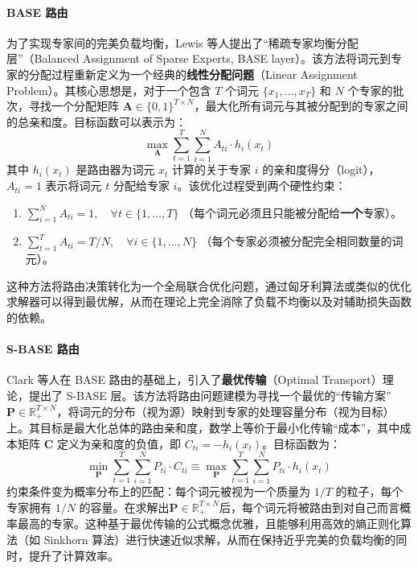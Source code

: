 \paragraph{BASE 路由}
为了实现专家间的完美负载均衡，Lewis 等人\cite{Lewis2021BASELS}提出了“稀疏专家均衡分配层”（Balanced Assignment of Sparse Experts, BASE layer）。该方法将词元到专家的分配过程重新定义为一个经典的\textbf{线性分配问题}（Linear Assignment Problem）。其核心思想是，对于一个包含 $T$ 个词元 $\{x_1, \dots, x_T\}$ 和 $N$ 个专家的批次，寻找一个分配矩阵 $\mathbf{A} \in \{0, 1\}^{T \times N}$，最大化所有词元与其被分配到的专家之间的总亲和度。目标函数可以表示为：
\begin{equation}
\max_{\mathbf{A}} \sum_{t=1}^{T} \sum_{i=1}^{N} A_{ti} \cdot h_i(x_t)
\end{equation}
其中 $h_i(x_t)$ 是路由器为词元 $x_t$ 计算的关于专家 $i$ 的亲和度得分（logit），$A_{ti}=1$ 表示将词元 $t$ 分配给专家 $i$。该优化过程受到两个硬性约束：
\begin{enumerate}
    \item $\sum_{i=1}^{N} A_{ti} = 1, \quad \forall t \in \{1, \dots, T\}$ （每个词元必须且只能被分配给\textbf{一个}专家）。
    \item $\sum_{t=1}^{T} A_{ti} = T/N, \quad \forall i \in \{1, \dots, N\}$ （每个专家必须被分配完全相同数量的词元）。
\end{enumerate}
这种方法将路由决策转化为一个全局联合优化问题，通过匈牙利算法或类似的优化求解器可以得到最优解，从而在理论上完全消除了负载不均衡以及对辅助损失函数的依赖。

\paragraph{S-BASE 路由}
Clark 等人\cite{Clark2022UnifiedSL}在 BASE 路由的基础上，引入了\textbf{最优传输}（Optimal Transport）理论，提出了 S-BASE 层。该方法将路由问题建模为寻找一个最优的“传输方案” $\mathbf{P} \in \mathbb{R}_{+}^{T \times N}$，将词元的分布（视为源）映射到专家的处理容量分布（视为目标）上。其目标是最大化总体的路由亲和度，数学上等价于最小化传输“成本”，其中成本矩阵 $\mathbf{C}$ 定义为亲和度的负值，即 $C_{ti} = -h_i(x_t)$。目标函数为：
\begin{equation}
\min_{\mathbf{P}} \sum_{t=1}^{T} \sum_{i=1}^{N} P_{ti} \cdot C_{ti} \equiv \max_{\mathbf{P}} \sum_{t=1}^{T} \sum_{i=1}^{N} P_{ti} \cdot h_i(x_t)
\end{equation}
约束条件变为概率分布上的匹配：每个词元被视为一个质量为 $1/T$ 的粒子，每个专家拥有 $1/N$ 的容量。在求解出$\mathbf{P} \in \mathbb{R}_{+}^{T \times N}$后，每个词元将被路由到对自己而言概率最高的专家。这种基于最优传输的公式概念优雅，且能够利用高效的熵正则化算法（如 Sinkhorn 算法）进行快速近似求解，从而在保持近乎完美的负载均衡的同时，提升了计算效率。

